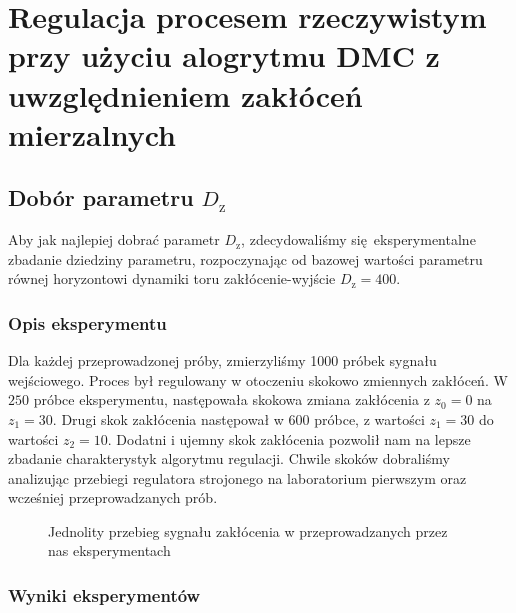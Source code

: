 \chapter{Regulacja procesem rzeczywistym przy użyciu alogrytmu DMC z uwzględnieniem zakłóceń mierzalnych}
\label{lab5}

\section{Dobór parametru $D_{\mathrm{z}}$}
\label{lab5_dobor_Dz}
Aby jak najlepiej dobrać parametr $D_{\mathrm{z}}$, zdecydowaliśmy się eksperymentalne 
zbadanie dziedziny parametru, rozpoczynając od bazowej wartości parametru równej
horyzontowi dynamiki toru zakłócenie-wyjście $D_{\mathrm{z}} = \num{400}$. 

\subsection{Opis eksperymentu}
\label{lab5_opis} 
Dla każdej przeprowadzonej próby, zmierzyliśmy 1000 próbek sygnału wejściowego. Proces był
regulowany w otoczeniu skokowo zmiennych zakłóceń. W $\num{250}$ próbce eksperymentu, następowała
skokowa zmiana zakłócenia z $z_{0} = \num{0}$ na $z_{1} = \num{30}$. Drugi skok zakłócenia następował
w $\num{600}$ próbce, z wartości $z_{1} = \num{30}$ do wartości $z_{2} = \num{10}$. Dodatni i ujemny skok
zakłócenia pozwolił nam na lepsze zbadanie charakterystyk algorytmu regulacji. Chwile skoków dobraliśmy
analizując przebiegi regulatora strojonego na laboratorium pierwszym oraz wcześniej przeprowadzanych prób.

\begin{figure}[b]
    \centering
    \caption{Jednolity przebieg sygnału zakłócenia w przeprowadzanych przez nas eksperymentach}
    \label{zad5_lab_zaklocenia}
\end{figure}


\subsection{Wyniki eksperymentów}
\label{zad5_wyniki}

